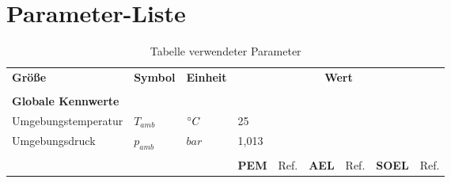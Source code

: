 \documentclass[onecolumn,10pt,titlepage]{article}
\begin{document}
\appendix
\section{Parameter-Liste}

\begin{table}[]
	\tiny
	
	\caption{Tabelle verwendeter Parameter}
	\label{tab-param2}
	\begin{tabular*}{\textwidth}{lllllllll}
		
		
		
		\multirow{2}{*}{\textbf{Größe}} & \multirow{2}{*}{\textbf{Symbol}} & \multirow{2}{*}{\textbf{Einheit}} & \multicolumn{6}{c}{\multirow{2}{*}{\textbf{Wert}}} \\
		
		&&&&&&&& \\ \hline \hline
		
		&&&&&&&& \\
		
		\textbf{Globale Kennwerte}&&&&&&&& \\
		
		Umgebungstemperatur 			& $T_{amb}$			& $\degree{C}$		& \multicolumn{6}{l}{25} \\
		Umgebungsdruck		 			& $p_{amb}$			& $bar		$		& \multicolumn{6}{l}{1,013} \\
		
		&&&&&&&& \\
		
		
		&&&  \textbf{PEM} & Ref. & \textbf{AEL} & Ref. & \textbf{SOEL} & Ref. \\
		

\end{tabular*}
\end{table}
\end{document}
